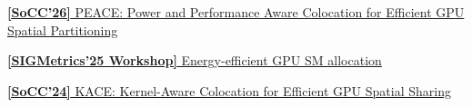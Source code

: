 \begin{zitemize}
    \item \href{https://www3.cs.stonybrook.edu/~anshul/socc26_peace.pdf}{\textbf{[SoCC'26]} PEACE: Power and Performance Aware Colocation for Efficient GPU Spatial Partitioning}
    \item \href{https://bhan.im/static/publications/preprint/aicrossroads25_gpusm.pdf}{\textbf{[SIGMetrics'25 Workshop]} Energy-efficient GPU SM allocation}
    \item \href{https://bhan.im/static/publications/preprint/KACE_preprint.pdf}{\textbf{[SoCC'24]} KACE: Kernel-Aware Colocation for Efficient GPU Spatial Sharing}
\end{zitemize}
